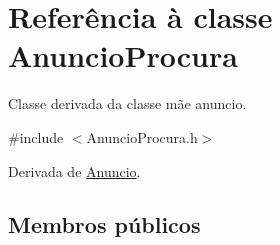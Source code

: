 \hypertarget{class_anuncio_procura}{\section{Referência à classe Anuncio\+Procura}
\label{class_anuncio_procura}
}


Classe derivada da classe mãe anuncio.  




{\ttfamily \#include $<$Anuncio\+Procura.\+h$>$}



Derivada de \hyperlink{class_anuncio}{Anuncio}.

\subsection*{Membros públicos}
